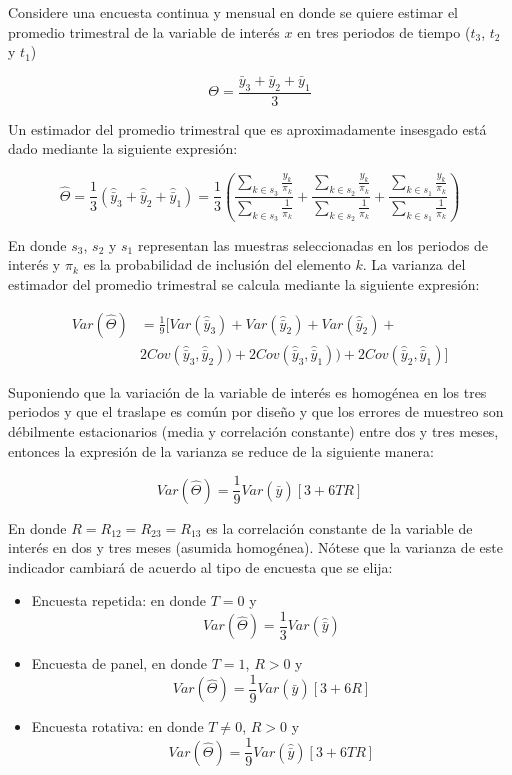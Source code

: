 \documentclass[
  12pt,
  spanish,
]{book}
\providecommand{\tightlist}{%
  \setlength{\itemsep}{0pt}\setlength{\parskip}{0pt}}
\begin{document}
Considere una encuesta continua y mensual en donde se quiere estimar el
promedio trimestral de la variable de interés \(x\) en tres periodos de
tiempo (\(t_3\), \(t_2\) y \(t_1\))

\[
\Theta = \frac{\bar{y}_3 + \bar{y}_2 + \bar{y}_1}{3}
\]

Un estimador del promedio trimestral que es aproximadamente insesgado está dado mediante la siguiente expresión:

\[
\hat{\Theta} = \frac{1}{3} \left( \hat{\bar{y}}_3 + \hat{\bar{y}}_2 + \hat{\bar{y}}_1 \right)
= \frac{1}{3}\left( \frac{\sum_{k\in s_3}\frac{y_{k}}{\pi_k}}{\sum_{k\in s_3}\frac{1}{\pi_k}} + \frac{\sum_{k\in s_2}\frac{y_{k}}{\pi_k}}{\sum_{k\in s_2}\frac{1}{\pi_k}} + \frac{\sum_{k\in s_1}\frac{y_{k}}{\pi_k}}{\sum_{k\in s_1}\frac{1}{\pi_k}} \right)
\]

En donde \(s_3\), \(s_2\) y \(s_1\) representan las muestras seleccionadas en
los periodos de interés y \(\pi_k\) es la probabilidad de inclusión del
elemento \(k\). La varianza del estimador del promedio trimestral se
calcula mediante la siguiente expresión:

\[
\begin{split}
Var(\hat{\Theta}) & = \frac{1}{9}[Var(\hat{\bar{y}}_3) + Var(\hat{\bar{y}}_2) + Var(\hat{\bar{y}}_2) + \\ 
&2Cov(\hat{\bar{y}}_3, \hat{\bar{y}}_2)) + 2Cov(\hat{\bar{y}}_3, \hat{\bar{y}}_1)) + 2Cov(\hat{\bar{y}}_2, \hat{\bar{y}}_1)]
\end{split}
\]

Suponiendo que la variación de la variable de interés es homogénea en
los tres periodos y que el traslape es común por diseño y que los errores
de muestreo son débilmente estacionarios (media y correlación constante) entre dos y tres meses,
entonces la expresión de la varianza se reduce de la siguiente manera:

\[
Var(\hat{\Theta}) = \frac{1}{9} Var(\hat{\bar{y}})[3 + 6TR]
\]

En donde \(R=R_{12}=R_{23}=R_{13}\) es la correlación constante de la variable de interés en dos y tres
meses (asumida homogénea). Nótese que la varianza de este indicador
cambiará de acuerdo al tipo de encuesta que se elija:

\begin{itemize}
\tightlist
\item
  Encuesta repetida: en donde \(T=0\) y
  \[Var(\hat{\Theta}) = \frac{1}{3} Var(\hat{\bar{y}})\]
\item
  Encuesta de panel, en donde \(T=1\), \(R > 0\) y
  \[Var(\hat{\Theta}) = \frac{1}{9} Var(\hat{\bar{y}}) [3+6R]\]
\item
  Encuesta rotativa: en donde \(T\neq 0\), \(R > 0\) y
  \[Var(\hat{\Theta}) = \frac{1}{9} Var(\hat{\bar{y}}) [3+6TR]\]
\end{itemize}
\end{document}
